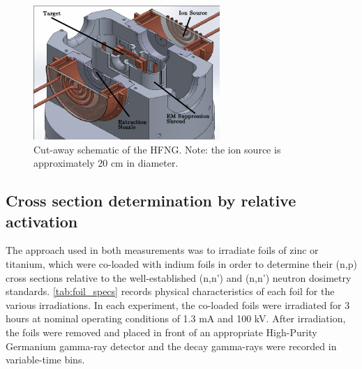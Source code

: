 \documentclass[5p]{elsarticle}
\begin{document}

\begin{figure}
    \centering
        \centering
        \includegraphics[height=2in]{./figures/target2.png}
        \caption{Cut-away schematic of the HFNG. Note: the ion source is approximately 20 cm in diameter.}
                \label{fig:hfng_b}
\end{figure}


\subsection{Cross section determination by relative activation}\label{sec:sample_loading}


The approach used in both measurements was to irradiate foils of zinc or titanium, which were co-loaded with indium foils in order to determine their (n,p) cross sections relative to the well-established (n,n') and (n,n') neutron dosimetry standards.   \autoref{tab:foil_specs} records physical characteristics of each foil for the various irradiations. In each experiment, the co-loaded foils were irradiated for 3 hours at nominal operating conditions of 1.3 mA and 100 kV.  After irradiation, the foils were removed and placed in front of an appropriate High-Purity Germanium gamma-ray detector and the decay gamma-rays were recorded in variable-time bins.   
\end{document}
